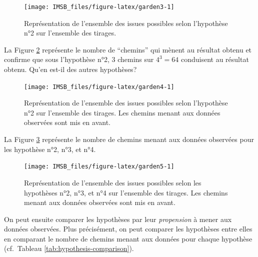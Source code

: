 \documentclass[
  a4paper,11pt,twoside,onecolumn,openright,final,oldfontcommands]{memoir}
\theoremstyle{definition}
\theoremstyle{definition}
\theoremstyle{definition}
\theoremstyle{definition}
\theoremstyle{remark}
\begin{document}
\begin{figure}[!htb]

{\centering \texttt{[image: IMSB\_files/figure-latex/garden3-1]} 

}

\caption{Représentation de l'ensemble des issues possibles selon l'hypothèse n°2 sur l'ensemble des tirages.}\label{fig:garden3}
\end{figure}

La Figure \ref{fig:garden4} représente le nombre de ``chemins'' qui mènent au résultat obtenu et confirme que sous l'hypothèse n°2, \(3\) chemins sur \(4^{3} = 64\) conduisent au résultat obtenu. Qu'en est-il des autres hypothèses?

\begin{figure}[!htb]

{\centering \texttt{[image: IMSB\_files/figure-latex/garden4-1]} 

}

\caption{Représentation de l'ensemble des issues possibles selon l'hypothèse n°2 sur l'ensemble des tirages. Les chemins menant aux données observées sont mis en avant.}\label{fig:garden4}
\end{figure}

La Figure \ref{fig:garden5} représente le nombre de chemins menant aux données observées pour les hypothèse n°2, n°3, et n°4.

\begin{figure}[!htb]

{\centering \texttt{[image: IMSB\_files/figure-latex/garden5-1]} 

}

\caption{Représentation de l'ensemble des issues possibles selon les hypothèses n°2, n°3, et n°4 sur l'ensemble des tirages. Les chemins menant aux données observées sont mis en avant.}\label{fig:garden5}
\end{figure}

On peut ensuite comparer les hypothèses par leur \emph{propension} à mener aux données observées. Plus précisément, on peut comparer les hypothèses entre elles en comparant le nombre de chemins menant aux données pour chaque hypothèse (cf.~Tableau \ref{tab:hypothesis-comparison}).
\end{document}

